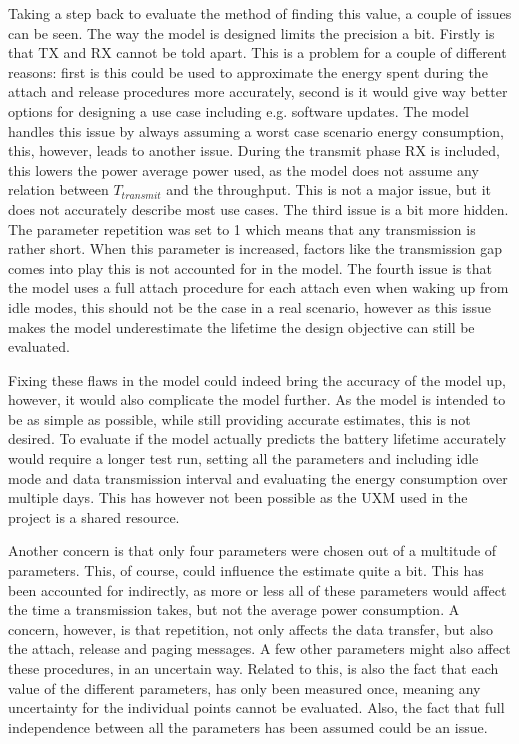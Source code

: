 Taking a step back to evaluate the method of finding this value, a couple of issues can be seen. The way the model is designed limits the precision a bit. Firstly is that TX and RX cannot be told apart. This is a problem for a couple of different reasons: first is this could be used to approximate the energy spent during the attach and release procedures more accurately, second is it would give way better options for designing a use case including e.g. software updates. The model handles this issue by always assuming a worst case scenario energy consumption, this, however, leads to another issue. During the transmit phase RX is included, this lowers the power average power used, as the model does not assume any relation between $T_{transmit}$ and the throughput. This is not a major issue, but it does not accurately describe most use cases. The third issue is a bit more hidden. The parameter repetition was set to 1 which means that any transmission is rather short. When this parameter is increased, factors like the transmission gap comes into play this is not accounted for in the model. The fourth issue is that the model uses a full attach procedure for each attach even when waking up from idle modes, this should not be the case in a real scenario, however as this issue makes the model underestimate the lifetime the design objective can still be evaluated.

Fixing these flaws in the model could indeed bring the accuracy of the model up, however, it would also complicate the model further. As the model is intended to be as simple as possible, while still providing accurate estimates, this is not desired. To evaluate if the model actually predicts the battery lifetime accurately would require a longer test run, setting all the parameters and including idle mode and data transmission interval and evaluating the energy consumption over multiple days. This has however not been possible as the UXM used in the project is a shared resource. 

Another concern is that only four parameters were chosen out of a multitude of parameters. This, of course, could influence the estimate quite a bit. This has been accounted for indirectly, as more or less all of these parameters would affect the time a transmission takes, but not the average power consumption. A concern, however, is that repetition, not only affects the data transfer, but also the attach, release and paging messages. A few other parameters might also affect these procedures, in an uncertain way. Related to this, is also the fact that each value of the different parameters, has only been measured once, meaning any uncertainty for the individual points cannot be evaluated. Also, the fact that full independence between all the parameters has been assumed could be an issue. 

